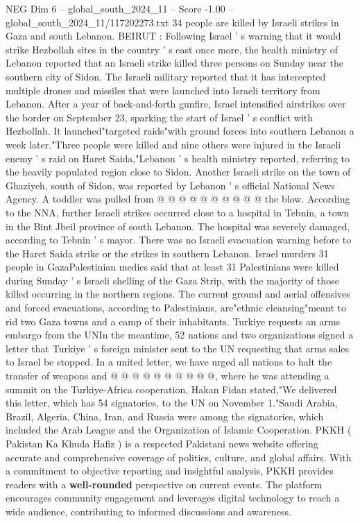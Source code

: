 \begin{textsample}{NEG Dim 6 – global\_south\_2024\_11 – Score -1.00 – global\_south\_2024\_11/117202273.txt}  \label{ex:f6_neg_115}
34 people are killed by Israeli strikes in Gaza and south Lebanon.
BEIRUT : Following Israel ' s warning that it would strike Hezbollah sites in the country ' s east once more, the health ministry of Lebanon reported that an Israeli strike killed three persons on Sunday near the southern city of Sidon.
The Israeli military reported that it has intercepted multiple drones and missiles that were launched into Israeli territory from Lebanon.
After a year of back-and-forth gunfire, Israel intensified airstrikes over the border on September 23, sparking the start of Israel ' s conflict with Hezbollah.
It launched"targeted raids"with ground forces into southern Lebanon a week later."Three people were killed and nine others were injured in the Israeli enemy ' s raid on Haret Saida,"Lebanon ' s health ministry reported, referring to the heavily populated region close to Sidon.
Another Israeli strike on the town of Ghaziyeh, south of Sidon, was reported by Lebanon ' s official National News Agency.
A toddler was pulled from @ @ @ @ @ @ @ @ @ @ the blow.
According to the NNA, further Israeli strikes occurred close to a hospital in Tebnin, a town in the Bint Jbeil province of south Lebanon.
The hospital was severely damaged, according to Tebnin ' s mayor.
There was no Israeli evacuation warning before to the Haret Saida strike or the strikes in southern Lebanon.
Israel murders 31 people in GazaPalestinian medics said that at least 31 Palestinians were killed during Sunday ' s Israeli shelling of the Gaza Strip, with the majority of those killed occurring in the northern regions.
The current ground and aerial offensives and forced evacuations, according to Palestinians, are"ethnic cleansing"meant to rid two Gaza towns and a camp of their inhabitants.
Turkiye requests an arms embargo from the UNIn the meantime, 52 nations and two organizations signed a letter that Turkiye ' s foreign minister sent to the UN requesting that arms sales to Israel be stopped.
In a united letter, we have urged all nations to halt the transfer of weapons and @ @ @ @ @ @ @ @ @ @, where he was attending a summit on the Turkiye-Africa cooperation, Hakan Fidan stated,"We delivered this letter, which has 54 signatories, to the UN on November 1."Saudi Arabia, Brazil, Algeria, China, Iran, and Russia were among the signatories, which included the Arab League and the Organization of Islamic Cooperation.
PKKH ( Pakistan Ka Khuda Hafiz ) is a respected Pakistani news website offering accurate and comprehensive coverage of politics, culture, and global affairs.
With a commitment to objective reporting and insightful analysis, PKKH provides readers with a \textbf{well-rounded} perspective on current events.
The platform encourages community engagement and leverages digital technology to reach a wide audience, contributing to informed discussions and awareness.

\end{textsample}
